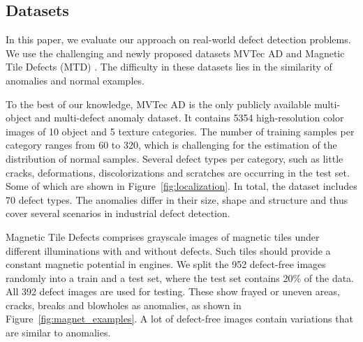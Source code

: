 \documentclass[10pt,twocolumn,letterpaper]{article}
\begin{document}
\subsection{Datasets}
In this paper, we evaluate our approach on real-world defect detection problems. 
We use the challenging and newly proposed datasets MVTec AD \cite{mvtec} and Magnetic Tile Defects (MTD) \cite{magnets}.
The difficulty in these datasets lies in the similarity of anomalies and normal examples.


To the best of our knowledge, MVTec AD is the only publicly available multi-object and multi-defect anomaly dataset.
It contains 5354 high-resolution color images of 10 object and 5 texture categories.
The number of training samples per category ranges from 60 to 320, which is challenging for the estimation of the distribution of normal samples.
Several defect types per category, such as little cracks, deformations, discolorizations and scratches are occurring in the test set.
Some of which are shown in Figure~\ref{fig:localization}.
In total, the dataset includes 70 defect types.
The anomalies differ in their size, shape and structure and thus cover several scenarios in industrial defect detection.

Magnetic Tile Defects \cite{magnets} comprises grayscale images of magnetic tiles under different illuminations with and without defects.
Such tiles should provide a constant magnetic potential in engines.
We split the 952 defect-free images randomly into a train and a test set, where the test set contains 20\% of the data.
All 392 defect images are used for testing.
These show frayed or uneven areas, cracks, breaks and blowholes as anomalies, as shown in Figure~\ref{fig:magnet_examples}.
A lot of defect-free images contain variations that are similar to anomalies.
\end{document}
